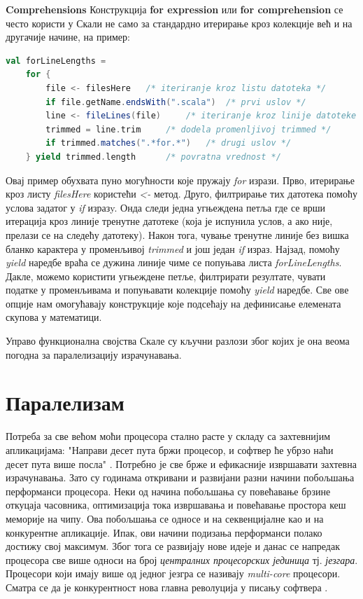 \documentclass[12pt,oneside]{memoir}
\begin{document}
\begin{description}
\item \textbf{Comprehensions}
Конструкција \textbf{for expression} или \textbf{for comprehension} се често користи у Скали не само за стандардно итерирање кроз колекције већ и на другачије начине, на пример:
\begin{lstlisting}[language=Scala]
val forLineLengths =
	for {
		file <- filesHere 	/* iteriranje kroz listu datoteka */
		if file.getName.endsWith(".scala") 	/* prvi uslov */
		line <- fileLines(file) 	/* iteriranje kroz linije datoteke */
		trimmed = line.trim 	/* dodela promenljivoj trimmed */
		if trimmed.matches(".*for.*") 	/* drugi uslov */
	} yield trimmed.length 		/* povratna vrednost */
\end{lstlisting}
Овај пример обухвата пуно могућности које пружају \textit{for} изрази. Прво, итерирање кроз листу \textit{filesHere} користећи \textit{<-} метод. Друго, филтрирање тих датотека помоћу услова задатог у \textit{if} изразy. Онда следи једна угњеждена петља где се врши итерација кроз линије тренутне датотеке (која је испунила услов, а ако није, прелази се на следећу датотеку). Након тога, чување тренутне линије без вишка бланко карактера у променљивој \textit{trimmed} и још један \textit{if} израз. Најзад, помоћу \textit{yield} наредбе враћа се дужина линије чиме се попуњава листа \textit{forLineLengths}. Дакле, можемо користити угњеждене петље, филтрирати резултате, чувати податке у променљивама и попуњавати колекције помоћу \textit{yield} наредбе. Све ове опције нам омогућавају конструкције које подсећају на дефинисање елемената скупова у математици.
\end{description}

\par Управо функционална својства Скале су кључни разлози због којих је она веома погодна за паралелизацију израчунавања. 

\section{Паралелизам}
\label{sec:paralelizam}

Потреба за све већом моћи процесора стално расте у складу са захтевнијим апликацијама: "Направи десет пута бржи процесор, и софтвер ће убрзо наћи десет пута више посла" \cite{freeLunch}. Потребно је све брже и ефикасније извршавати захтевна израчунавања. Зато су годинама откривани и развијани разни начини побољшања перформанси процесора. Неки од начина побољшања су повећавање брзине откуцаја часовника, оптимизација тока извршавања и повећавање простора кеш меморије на чипу. Ова побољшања се односе и на секвенцијалне као и на конкурентне апликације. Ипак, ови начини подизања перформанси полако достижу свој максимум. Због тога се развијају нове идеје и данас се напредак процесора све више односи на број \textit{централних процесорских јединица} тј. \textit{језгара}. Процесори који имају више од једног језгра се називају \textit{multi-core} процесори. Сматра се да је конкурентност нова главна револуција у писању софтвера \cite{freeLunch, survey}.
\end{document}
